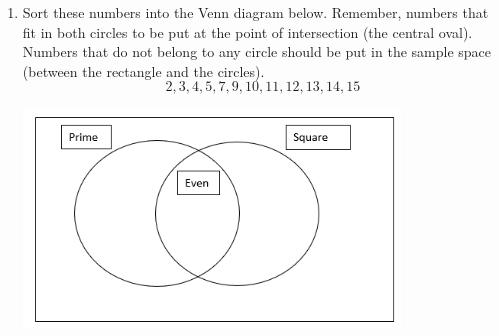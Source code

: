 \documentclass{article}
\begin{document}
\begin{enumerate}
\item \quad Sort these numbers into the Venn diagram below. Remember, numbers that fit in both circles to be put at the point of intersection (the central oval). Numbers that do not belong to any circle should be put in the sample space (between the rectangle and the circles). 
\[ 2, 3, 4, 5, 7, 9, 10, 11, 12, 13, 14, 15 \]
\begin{center}
 \includegraphics[width=10cm]{Year_6_Mixed_Tests/Homework_Tasks/Venn1.png}   
\end{center}
 
\end{enumerate}
\end{document}

